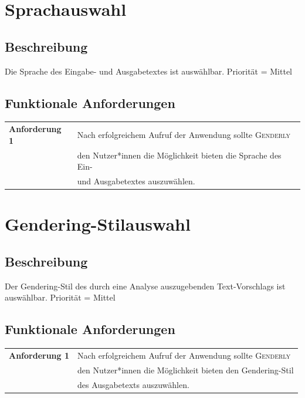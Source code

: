 \documentclass[paper=a4, parskip=half]{scrreprt}
\newcommand{\Genderly}{\textsc{Genderly}}
\begin{document}
\pagebreak

\section{Sprachauswahl}
\subsection{Beschreibung}
Die Sprache des Eingabe- und Ausgabetextes ist auswählbar. Priorität = Mittel
\subsection{Funktionale Anforderungen}
\begin{table}[!htb]
\begin{tabular}{ll}
\textbf{Anforderung 1} & Nach erfolgreichem Aufruf der Anwendung sollte \Genderly{} \\
& den Nutzer*innen die Möglichkeit bieten die Sprache des Ein- \\
& und Ausgabetextes auszuwählen. \vspace{0.15cm} \\
\end{tabular}
\end{table}

\section{Gendering-Stilauswahl}
\subsection{Beschreibung}
Der Gendering-Stil des durch eine Analyse auszugebenden Text-Vorschlags ist auswählbar. Priorität = Mittel
\subsection{Funktionale Anforderungen}
\begin{table}[!htb]
\begin{tabular}{ll}
\textbf{Anforderung 1} & Nach erfolgreichem Aufruf der Anwendung sollte \Genderly{} \\
& den Nutzer*innen die Möglichkeit bieten den Gendering-Stil \\
& des Ausgabetexts auszuwählen. \vspace{0.15cm} \\
\end{tabular}
\end{table}
\end{document}
